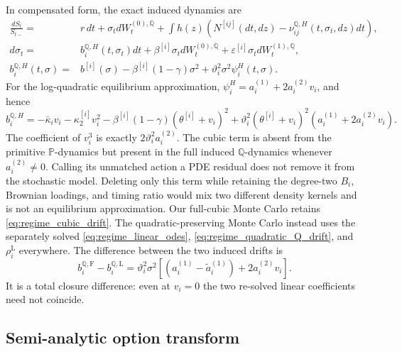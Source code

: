 \documentclass[11pt]{article}
\theoremstyle{remark}
\newcommand{\PP}{\mathbb{P}}
\newcommand{\QQ}{\mathbb{Q}}
\begin{document}
In compensated form, the exact induced dynamics are
\begin{equation}\label{eq:regime_Q_dynamics}
\begin{split}
\frac{dS_t}{S_{t-}}={}&r\,dt+\sigma_t dW_t^{(0),\QQ}
+\int h(z)\left(N^{[ij]}(dt,dz)-\nu_{ij}^{\QQ,H}(t,\sigma_t,dz)dt\right),\\
d\sigma_t={}&b_i^{\QQ,H}(t,\sigma_t)dt
+\beta^{[i]}\sigma_t dW_t^{(0),\QQ}
+\varepsilon^{[i]}\sigma_t dW_t^{(1),\QQ},\\
b_i^{\QQ,H}(t,\sigma)={}&b^{[i]}(\sigma)
-\beta^{[i]}(1-\gamma)\sigma^2+\vartheta_i^2\sigma^2\psi_i^H(t,\sigma).
\end{split}
\end{equation}
For the log-quadratic equilibrium approximation,
$\psi_i^H=a_i^{(1)}+2a_i^{(2)}v_i$, and hence
\begin{equation}\label{eq:regime_cubic_drift}
b_i^{\QQ,H}=-\bar\kappa_i v_i-\kappa_2^{[i]}v_i^2
-\beta^{[i]}(1-\gamma)(\theta^{[i]}+v_i)^2
+\vartheta_i^2(\theta^{[i]}+v_i)^2
\left(a_i^{(1)}+2a_i^{(2)}v_i\right).
\end{equation}
The coefficient of $v_i^3$ is exactly
$2\vartheta_i^2a_i^{(2)}$.  The cubic term is absent from the primitive
$\PP$-dynamics but present in the full induced $\QQ$-dynamics whenever
$a_i^{(2)}\ne0$.  Calling its unmatched action a PDE residual does not remove it
from the stochastic model.  Deleting only this term while retaining the degree-two
$B_i$, Brownian loadings, and timing ratio would mix two different density kernels
and is not an equilibrium approximation.  Our full-cubic Monte Carlo retains
\eqref{eq:regime_cubic_drift}.  The quadratic-preserving Monte Carlo instead uses
the separately solved \eqref{eq:regime_linear_odes},
\eqref{eq:regime_quadratic_Q_drift}, and $\rho_i^{\mathrm L}$ everywhere.
The difference between the two induced drifts is
\begin{equation}\label{eq:regime_drift_closure_difference}
b_i^{\QQ,\mathrm F}-b_i^{\QQ,\mathrm L}
=\vartheta_i^2\sigma^2\left[
(a_i^{(1)}-\widetilde a_i^{(1)})+2a_i^{(2)}v_i\right].
\end{equation}
It is a total closure difference: even at $v_i=0$ the two re-solved linear
coefficients need not coincide.

\subsection{Semi-analytic option transform}
\end{document}
